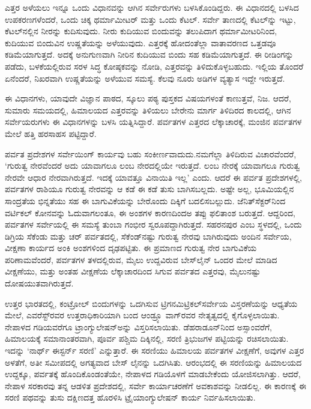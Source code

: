 \vskip 3pt

ಎತ್ತರ ಅಳೆಯಲು ಇನ್ನೂ ಒಂದು ವಿಧಾನವನ್ನು ಆಗಿನ ಸರ್ವೇರುಗಳು ಬಳಸಿಕೊಂಡಿದ್ದರು. ಈ ವಿಧಾನದಲ್ಲಿ ಬಳಸಿದ ಉಪಕರಣಗಳೆಂದರೆ, ಒಂದು ಚಿಕ್ಕ ಥರ್ಮಾಮೀಟರ್​ ಮತ್ತು ಒಂದು ಕೆಟಲ್​. ಸರ್ವೇ ತಾಣದಲ್ಲಿ ಕೆಟಲ್​ನ್ನು ಇಟ್ಟು, ಕೆಟಲ್​ನಲ್ಲಿನ ನೀರನ್ನು ಕುದಿಸುವುದು. ನೀರು ಕುದಿಯುವ ಬಿಂದುವನ್ನು ತಲುಪಿದಾಗ ಥರ್ಮಾಮೀಟರಿನಿಂದ, ಕುದಿಯುವ ಬಿಂದುವಿನ ಉಷ್ಣತೆಯನ್ನು ಅಳೆಯುವುದು. ಎತ್ತರಕ್ಕೆ ಹೋದಂತೆಲ್ಲಾ ವಾತಾವರಣದ ಒತ್ತಡವೂ ಕಡಿಮೆಯಾಗುತ್ತದೆ. ಅದಕ್ಕೆ ಅನುಗುಣವಾಗಿ ನೀರಿನ ಕುದಿಯುವ ಬಿಂದು ಸಹ ಕಡಿಮೆಯಾಗುತ್ತದೆ. ಈ ರೀಡಿಂಗನ್ನು ಪಡೆದು, ಬಳಕೆಯಲ್ಲಿರುವ ಸರಳ ಸಿದ್ಧ ಕೋಷ್ಠಕವನ್ನು ನೋಡಿ, ಎತ್ತರವನ್ನು ತಿಳಿದುಕೊಳ್ಳಬಹುದು. ಇಲ್ಲಿಯ ತೊಂದರೆ ಏನೆಂದರೆ, ನಿಖರವಾಗಿ ಉಷ್ಣತೆಯನ್ನು ಅಳೆಯುವ ಸಮಸ್ಯೆ. ಕೆಲವು ನೂರು ಅಡಿಗಳ ವ್ಯತ್ಯಾಸ ಇದ್ದೇ ಇರುತ್ತದೆ.

\newpage

ಈ ವಿಧಾನಗಳು, ಯಾವುದೇ ವಿಜ್ಞಾನ ಪಾಠದ, ಸ್ಕೂಲು ಪಠ್ಯ ಪುಸ್ತಕದ ವಿಷಯಗಳಂತೆ ಕಾಣುತ್ತವೆ, ನಿಜ. ಆದರೆ, ಸುಮಾರು  ಸಮಯದಲ್ಲಿ, ಹಿಮಾಲಯದ ಎತ್ತರವನ್ನು ತಿಳಿಯಲು ಬೇರೇನು ಮಾರ್ಗ ತಿಳಿದಿರದ ಕಾಲದಲ್ಲಿ, ಆಗಿನ ಸರ್ವೇಯರುಗಳು ಈ ವಿಧಾನಗಳನ್ನು ಬಳಸಿ ಯತ್ನಿಸಿದ್ದಾರೆ. ಪರ್ವತಗಳ ಎತ್ತರದ ಲೆಕ್ಕಾಚಾರಕ್ಕೆ, ಮಂಜಿನ ಪರ್ವತಗಳ ಮೇಲೆ ಹತ್ತಿ ಹರಸಾಹಸ ಪಟ್ಟಿದ್ದಾರೆ.

\vskip 5pt

ಪರ್ವತ ಪ್ರದೇಶಗಳ ಸರ್ವೇಯಿಂಗ್​ ಕಾರ್ಯವು ಬಹು ಸಂಕೀರ್ಣವಾದುದು.\break ನಮಗೆಲ್ಲಾ ತಿಳಿದಿರುವ ವಿಚಾರವೆಂದರೆ, ‘ಗುರುತ್ವ ನೇರವೆಂದರೆ ಅದು ಯಾವಾಗಲೂ ಲಂಬ ನೇರದಲ್ಲಿಯೇ ಇರುತ್ತದೆ. ಲಂಬ ನೇರಕ್ಕೆ ಯಾವಾಗಲೂ ಗುರುತ್ವ ನೇರವೇ ಆಧಾರ ನೇರವಾಗಿರುತ್ತದೆ. ಇದಕ್ಕೆ ಯಾವತ್ತೂ ವಿನಾಯಿತಿ ಇಲ್ಲ’ ಎಂದು. ಆದರೆ ಈ ಪರ್ವತ ಪ್ರದೇಶಗಳಲ್ಲಿ, ಪರ್ವತಗಳ ರಾಶಿಯೂ ಗುರುತ್ವ ನೇರವನ್ನು ಆ ಕಡೆ ಈ ಕಡೆ ತುಸು ಬಾಗಿಸಬಲ್ಲದು. ಅಷ್ಟೇ ಅಲ್ಲ, ಭೂಮಿಯಲ್ಲಿನ ಸಾಂದ್ರತೆಯ ಭಿನ್ನತೆಯು ಸಹ ಈ ಬಾಗುವಿಕೆಯನ್ನು ಬೇರೊಂದು ದಿಕ್ಕಿಗೆ ಬದಲಿಸಬಲ್ಲುದು. ಜೆನಿತ್​ ಸೆಕ್ಟರ್​ನಿಂದ ವರ್ಟಿಕಲ್​ ಕೋನವನ್ನು ಓದುವಾಗಲಂತೂ, ಈ ಅಂಶಗಳ ಕಾರಣದಿಂದಅ ತಪ್ಪು ಫಲಿತಾಂಶ ಬರುತ್ತದೆ. ಆದ್ದರಿಂದ, ಪರ್ವತಗಳ ಸರ್ವೇಯಲ್ಲಿ ಈ ಸಮಸ್ಯೆ ತುಂಬಾ ಗಂಭೀರ ಸ್ವರೂಪದ್ದಾಗಿರುತ್ತದೆ. ಸಹರನಪುರ ಎಂಬ ಸ್ಥಳದಲ್ಲಿ, ಒಂದು ಡಿಗ್ರಿಯ  ಸೆಕೆಂಡು ಮತ್ತು ಚರ್​ ಪರ್ವತದಲ್ಲಿ,  ಸೆಕೆಂಡ್​ನಷ್ಟು ಗುರುತ್ವ ನೇರವು ಬಾಗಿರುವುದು ಅಂದಿನ ಸರ್ವೇಯ, ವೀಕ್ಷಣಾ ಕಾರ್ಯದ ಅಂಕಿ ಅಂಶಗಳಿಂದ ದೃಢಪಟ್ಟಿತು. ಈ ಪ್ರಮಾಣದ ಗುರುತ್ವ ನೇರ ಬಾಗುವಿಕೆಯ ಪರಿಣಾಮವೆಂದರೆ, ಪರ್ವತಗಳ ತಳದಲ್ಲಿರುವ,  ಮೈಲು ಉದ್ದವಿರುವ ಬೇಸ್​ಲೈನ್​ ಒಂದರ ಮೇಲೆ ಮಾಡಿದ ವೀಕ್ಷಣೆಯು, ಮತ್ತು ಅಂತಹ ವೀಕ್ಷಣೆಯ ಲೆಕ್ಕಾಚಾರದಿಂದ ಸಿಗುವ ಪರ್ವತದ ಎತ್ತರವು,  ಮೈಲುನಷ್ಟು ದೋಷಯುತವಾಗಿರುತ್ತದೆ.

\vskip 5pt

ಉತ್ತರ ಭಾರತದಲ್ಲಿ, ಕಂಟ್ರೋಲ್​ ಬಿಂದುಗಳನ್ನು ಒದಗಿಸುವ ಟ್ರಿಗನಮಿಟ್ರಿಕಲ್​\break ಸರ್ವೇಯ ವಿಸ್ತರಣೆಯನ್ನು ಆಧ್ಯತೆಯ ಮೇಲೆ, ಎವರೆಸ್ಟ್​ರವರ ಉತ್ತರಾಧಿಕಾರಿಯಾಗಿ ಬಂದ ಆಂಡ್ರ್ಯೂ ವಾಗ್​ರವರ ನೇತೃತ್ವದಲ್ಲಿ ಕೈಗೊಳ್ಳಲಾಯಿತು. ನೇಪಾಳದ ಗಡಿಯವರೆಗೂ ಟ್ರಾಂಗ್ಯುಲೇಷನ್​ಅನ್ನು ವಿಸ್ತರಿಸಲಾಯಿತು. ಡೆಹರಾಡೂನ್​ನಿಂದ ಅಸ್ಸಾಂವರೆಗೆ, ಹಿಮಾಲಯಕ್ಕೆ ಸಮಾನಾಂತರವಾಗಿ, ಪೂರ್ವ ಪಶ್ಚಿಮ ದಿಕ್ಕಿನಲ್ಲಿ, ಸರಣಿ ತ್ರಿಭುಜಗಳ ಪಟ್ಟಿಯನ್ನು ರಚಿಸಲಾಯಿತು. ಇದನ್ನು ‘ನಾರ್ಥ್ ಈಸ್ಟರ್ನ್ ಸರಣಿ’ ಎನ್ನುತ್ತಾರೆ. ಈ ಸರಣಿಯು ಹಿಮಾಲಯ ಪರ್ವತಗಳ ವೀಕ್ಷಣೆಗೆ, ಅವುಗಳ ಎತ್ತರ ಅಳತೆಗೆ, ಅತೀ ಸಮೀಪದಲ್ಲಿ ಅಗತ್ಯವಾದ ಬೇಸ್​ ಲೈನನ್ನು ಒದಗಿಸಿತು. ಆರಂಭದಲ್ಲಿ ಈ ಸರಣಿಯನ್ನು ಹಿಮಾಲಯದ ಉದ್ದಕ್ಕೂ, ಪರ್ವತಕ್ಕೆ ಹೊಂದಿಕೊಂಡಂತೆಯೇ, ನೇಪಾಳದ ಗಡಿಯೊಳಗೆ ಮಾಡಬೇಕೆಂದು ಯೋಜಿಸಲಾಗಿತ್ತು. ಆದರೆ, ನೇಪಾಳ ಸರಕಾರವು ತನ್ನ ಆಡಳಿತ ಪ್ರದೇಶದಲ್ಲಿ, ಸರ್ವೇ ಕಾರ್ಯಾಚರಣೆಗೆ ಅವಕಾಶವನ್ನು ನೀಡಲಿಲ್ಲ. ಈ ಕಾರಣಕ್ಕೆ ಈ ಸರಣಿ ಪಥವನ್ನು ತುಸು ದಕ್ಷಿಣದತ್ತ ಹೊರಳಿಸಿ ಟ್ರೈಯಾಂಗ್ಯುಲೇಷನ್​ ಕಾರ್ಯ ನಿರ್ವಹಿಸಲಾಯಿತು.

